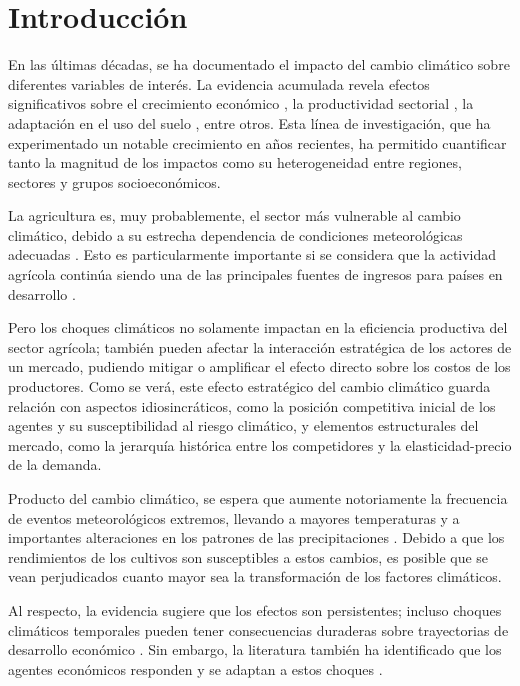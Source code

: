 \chapter{Introducción}

En las últimas décadas, se ha documentado el impacto del cambio climático sobre diferentes variables de interés. La evidencia acumulada revela efectos significativos sobre el crecimiento económico \citep{bilal2024macroeconomic, dell2012temperature}, la productividad sectorial \citep{chen2021response}, la adaptación en el uso del suelo \citep{figari2025climate}, entre otros. Esta línea de investigación, que ha experimentado un notable crecimiento en años recientes, ha permitido cuantificar tanto la magnitud de los impactos como su heterogeneidad entre regiones, sectores y grupos socioeconómicos.

La agricultura es, muy probablemente, el sector más vulnerable al cambio climático, debido a su estrecha dependencia de condiciones meteorológicas adecuadas \citep{FisherEtAl2012}. Esto es particularmente importante si se considera que la actividad agrícola continúa siendo una de las principales fuentes de ingresos para países en desarrollo \citep{ICO2009ClimateCoffee}.

Pero los choques climáticos no solamente impactan en la eficiencia productiva del sector agrícola; también pueden afectar la interacción estratégica de los actores de un mercado, pudiendo mitigar o amplificar el efecto directo sobre los costos de los productores. Como se verá, este efecto estratégico del cambio climático guarda relación con aspectos idiosincráticos, como la posición competitiva inicial de los agentes y su susceptibilidad al riesgo climático, y elementos estructurales del mercado, como la jerarquía histórica entre los competidores y la elasticidad-precio de la demanda.

Producto del cambio climático, se espera que aumente notoriamente la frecuencia de eventos meteorológicos extremos, llevando a mayores temperaturas y a importantes alteraciones en los patrones de las precipitaciones \citep{MideksaKallbekken2010}. Debido a que los rendimientos de los cultivos son susceptibles a estos cambios, es posible que se vean perjudicados cuanto mayor sea la transformación de los factores climáticos.

Al respecto, la evidencia sugiere que los efectos son persistentes; incluso choques climáticos temporales pueden tener consecuencias duraderas sobre trayectorias de desarrollo económico \citep{burke2016adaptation}. Sin embargo, la literatura también ha identificado que los agentes económicos responden y se adaptan a estos choques \citep{figari2025climate}.

